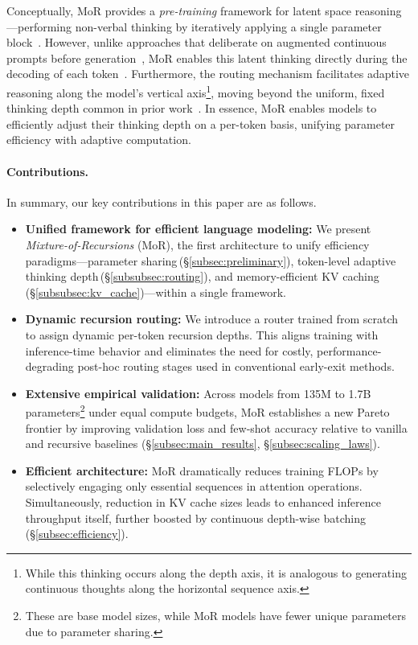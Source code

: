 Conceptually, MoR provides a \textit{pre-training} framework for latent space reasoning—performing non-verbal thinking by iteratively applying a single parameter block~\citep{hao2024training, geiping2025scaling, goyal2023think}. However, unlike approaches that deliberate on augmented continuous prompts before generation~\citep{liu2024deliberation, goyal2023think, hao2024training, shen2025codi}, MoR enables this latent thinking directly during the decoding of each token~\citep{zelikman2024quiet}. Furthermore, the routing mechanism facilitates adaptive reasoning along the model's vertical axis\footnote{While this thinking occurs along the depth axis, it is analogous to generating continuous thoughts along the horizontal sequence axis.}, moving beyond the uniform, fixed thinking depth common in prior work~\citep{geiping2025scaling, tack2025llm}. In essence, MoR enables models to efficiently adjust their thinking depth on a per-token basis, unifying parameter efficiency with adaptive computation.


\vspace{-6pt}
\paragraph{Contributions.}
In summary, our key contributions in this paper are as follows.
\vspace{-3pt}
\begin{itemize}[leftmargin=*, itemsep=2pt]
    \item \textbf{Unified framework for efficient language modeling:} We present \emph{Mixture-of-Recursions} (MoR), the first architecture to unify efficiency paradigms—parameter sharing\,(\S\ref{subsec:preliminary}), token-level adaptive thinking depth\,(\S\ref{subsubsec:routing}), and memory-efficient KV caching\,(\S\ref{subsubsec:kv_cache})—within a single framework.

     \item \textbf{Dynamic recursion routing:} We introduce a router trained from scratch to assign dynamic per-token recursion depths. This aligns training with inference-time behavior and eliminates the need for costly, performance-degrading post-hoc routing stages used in conventional early-exit methods.

    \item \textbf{Extensive empirical validation:} Across models from 135M to 1.7B parameters\footnote{These are base model sizes, while MoR models have fewer unique parameters due to parameter sharing.} under equal compute budgets, MoR establishes a new Pareto frontier by improving validation loss and few-shot accuracy relative to vanilla and recursive baselines (\S\ref{subsec:main_results}, \S\ref{subsec:scaling_laws}).
    
    \item \textbf{Efficient architecture:} MoR dramatically reduces training FLOPs by selectively engaging only essential sequences in attention operations. Simultaneously, reduction in KV cache sizes leads to enhanced inference throughput itself, further boosted by continuous depth-wise batching (\S\ref{subsec:efficiency}).
    
\end{itemize}


